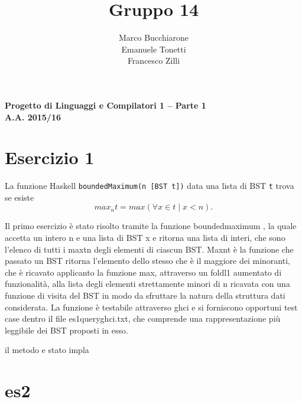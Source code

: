 \documentclass[a4paper, oneside, 11pt]{article}
\makeatletter
\renewcommand\and{\\}
\renewcommand\maketitle{%
\bigskip\bigskip\bigskip\bigskip%
\begin{center}\bfseries\large%
Progetto di Linguaggi e Compilatori 1 -- Parte 1 \\ A.A. 2015/16\\%
\end{center}%
\bigskip%
\begin{center}\bfseries\LARGE \@title  \end{center}%
\bigskip%
\begin{center}\bfseries\large \@author \end{center}%
\bigskip\bigskip}
\makeatother
\begin{document}
\title{Gruppo 14}
\author{Marco Bucchiarone \and Emanuele Tonetti \and Francesco Zilli}
\maketitle
\section{Esercizio 1}
La funzione Haskell \texttt{boundedMaximum(n [BST t])} data una lista di BST \texttt{t} trova se esiste  \[max_{n}{t}=max(\forall x \in t \mid  x<n ).\]

Il primo esercizio è stato risolto tramite la funzione boundedmaximum , la quale accetta un intero n e una lista di BST x e ritorna una lista di interi, che sono l'elenco di tutti i maxtn degli elementi di ciascun BST. Maxnt è la funzione che passato un BST ritorna l'elemento dello stesso che è il maggiore dei minoranti, che è ricavato applicanto la funzione max, attraverso un foldl1 aumentato di funzionalità, alla lista degli elementi strettamente minori di n ricavata con una funzione di visita del BST in modo da sfruttare la natura della struttura dati considerata. La funzione è testabile attraverso ghci e si forniscono opportuni test case dentro il file es1queryghci.txt, che comprende una rappresentazione più leggibile dei BST proposti in esso.

il metodo e stato impla

\section{es2}
\end{document}
